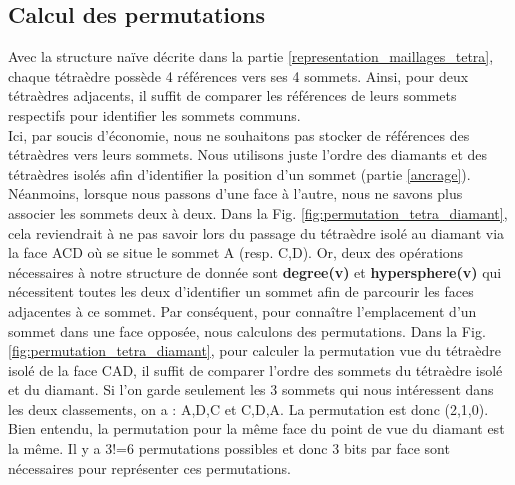\subsection{Calcul des permutations}
\noindent
Avec la structure naïve décrite dans la partie \ref{representation_maillages_tetra}, chaque tétraèdre possède 4 références vers ses 4 sommets. Ainsi, pour deux tétraèdres adjacents, il suffit de comparer les références de leurs sommets respectifs pour identifier les sommets communs.\\
Ici, par soucis d'économie, nous ne souhaitons pas stocker de références des tétraèdres vers leurs sommets. Nous utilisons juste l'ordre des diamants et des tétraèdres isolés afin d'identifier la position d'un sommet (partie \ref{ancrage}).\\
Néanmoins, lorsque nous passons d'une face à l'autre, nous ne savons plus associer les sommets deux à deux. Dans la Fig. \ref{fig:permutation_tetra_diamant}, cela reviendrait à ne pas savoir lors du passage du tétraèdre isolé au diamant via la face ACD où se situe le sommet A (resp. C,D). Or, deux des opérations nécessaires à notre structure de donnée sont \textbf{degree(v)} et \textbf{hypersphere(v)} qui nécessitent toutes les deux d'identifier un sommet afin de parcourir les faces adjacentes à ce sommet. Par conséquent, pour connaître l'emplacement d'un sommet dans une face opposée, nous calculons des permutations.
Dans la Fig. \ref{fig:permutation_tetra_diamant}, pour calculer la permutation vue du tétraèdre isolé de la face CAD, il suffit de comparer l'ordre des sommets du tétraèdre isolé et du diamant. Si l'on garde seulement les 3 sommets qui nous intéressent dans les deux classements, on a : A,D,C et C,D,A. La permutation est donc (2,1,0). Bien entendu, la permutation pour la même face du point de vue du diamant est la même. Il y a 3!=6 permutations possibles et donc 3 bits par face sont nécessaires pour représenter ces permutations.

